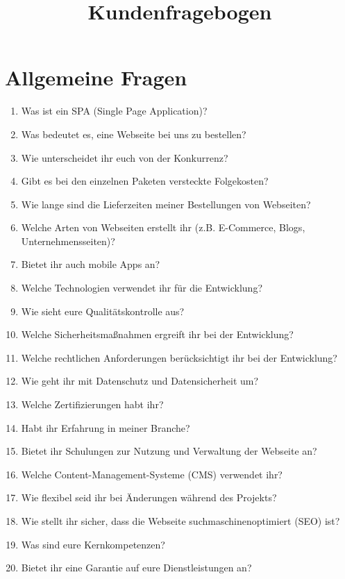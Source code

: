 \documentclass[a4paper,12pt]{article}
\title{Kundenfragebogen}
\author{}
\date{}
\begin{document}
\maketitle

\section*{Allgemeine Fragen}

\begin{enumerate}
    \item Was ist ein SPA (Single Page Application)?
    \item Was bedeutet es, eine Webseite bei uns zu bestellen?
    \item Wie unterscheidet ihr euch von der Konkurrenz?
    \item Gibt es bei den einzelnen Paketen versteckte Folgekosten?
    \item Wie lange sind die Lieferzeiten meiner Bestellungen von Webseiten?
    \item Welche Arten von Webseiten erstellt ihr (z.B. E-Commerce, Blogs, Unternehmensseiten)?
    \item Bietet ihr auch mobile Apps an?
    \item Welche Technologien verwendet ihr für die Entwicklung?
    \item Wie sieht eure Qualitätskontrolle aus?
    \item Welche Sicherheitsmaßnahmen ergreift ihr bei der Entwicklung?
    \item Welche rechtlichen Anforderungen berücksichtigt ihr bei der Entwicklung?
    \item Wie geht ihr mit Datenschutz und Datensicherheit um?
    \item Welche Zertifizierungen habt ihr?
    \item Habt ihr Erfahrung in meiner Branche?
    \item Bietet ihr Schulungen zur Nutzung und Verwaltung der Webseite an?
    \item Welche Content-Management-Systeme (CMS) verwendet ihr?
    \item Wie flexibel seid ihr bei Änderungen während des Projekts?
    \item Wie stellt ihr sicher, dass die Webseite suchmaschinenoptimiert (SEO) ist?
    \item Was sind eure Kernkompetenzen?
    \item Bietet ihr eine Garantie auf eure Dienstleistungen an?
\end{enumerate}
\end{document}
